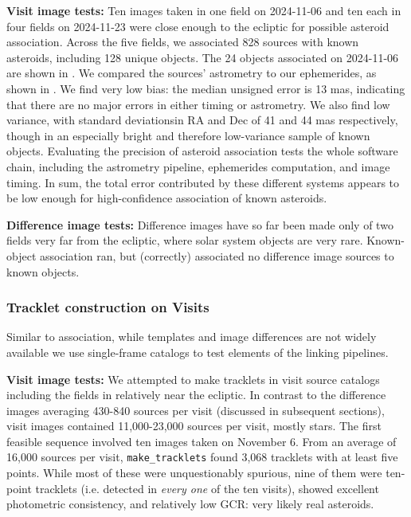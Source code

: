 {\bf Visit image tests:} Ten images taken in one field on 2024-11-06 and ten each in four fields on 2024-11-23 were close enough to the ecliptic for possible asteroid association. Across the five fields, we associated 828 sources with known asteroids, including 128 unique objects. The 24 objects associated on 2024-11-06 are shown in . We compared the sources' astrometry to our ephemerides, as shown in . We find very low bias: the median unsigned error is 13 mas, indicating that there are no major errors in either timing or astrometry. We also find low variance, with standard deviationsin RA and Dec of 41 and 44 mas respectively, though in an especially bright and therefore low-variance sample of known objects. Evaluating the precision of asteroid association tests the whole software chain, including the astrometry pipeline, ephemerides computation, and image timing. In sum, the total error contributed by these different systems appears to be low enough for high-confidence association of known asteroids.

{\bf Difference image tests:} Difference images have so far been made only of two fields very far from the ecliptic, where solar system objects are very rare. Known-object association ran, but (correctly) associated no difference image sources to known objects. 

\subsubsection{Tracklet construction on Visits}
\label{sec:linking}

Similar to association, while templates and image differences are not widely available we use single-frame catalogs to test elements of the linking pipelines.

{\bf Visit image tests:} We attempted to make tracklets in visit source catalogs including the fields in  relatively near the ecliptic. In contrast to the difference images averaging 430-840 sources per visit (discussed in subsequent sections), visit images contained 11,000-23,000 sources per visit, mostly stars. The first feasible sequence involved ten images taken on November 6. From an average of 16,000 sources per visit, {\tt make\_tracklets} found 3,068 tracklets with at least five points. While most of these were unquestionably spurious, nine of them were ten-point tracklets (i.e. detected in {\em every one} of the ten visits), showed excellent photometric consistency, and relatively low GCR: very likely real asteroids.

